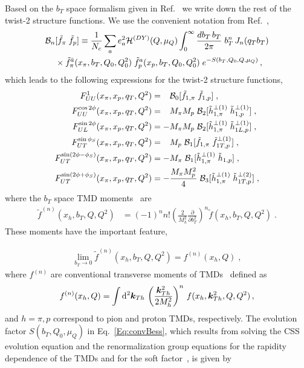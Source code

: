 \documentclass[a4paper]{article}
\newcommand{\nn}{\nonumber\\}
\newcommand{\be}{\begin{equation}}
\newcommand{\ee}{\end{equation}}
\newcommand{\di}{ {\rm d} }
\def\kTh{\bm k_{Th}}
\begin{document}
  Based on the $b_T$ space formalism given in Ref.~\cite{Boer:2011xd} we  write down the rest of the twist-2 structure functions. We use the convenient notation from Ref.~\cite{Bacchetta:2019qkv}, 
\begin{align}
     {\cal B}_n[\tilde f_{\pi}\; \tilde f_{p}] & \equiv  \frac{1}{N_c} 
     \sum_a e_a^2 {\cal H}^{(DY)}(Q,\mu_Q) \int_0^\infty \frac{d b_T\, b_T}{2\pi}\; b_T^n \, J_n(q_T b_T)
     \nn &\hskip -1cm \times  \tilde f_{\pi}^{\bar a}(x_\pi,{b_{T}},Q_0,Q_0^2) 
     \; \tilde f_{p}^{ a}(x_p,{b_{T}},Q_0,Q_0^2) \; e^{-S(b_{T},Q_0,Q,\mu_Q)}\, ,
    \label{Eq:convBess}
\end{align}
 which leads to the  following expressions for  the   twist-2 structure functions,
\begin{align}
{F}_{UU}^1(x_\pi,x_p,q_T,Q^2) &=
   \phantom{-}   {\cal B}_0[\tilde f_{1, \pi}\; \tilde f_{1,p}] \; ,
    \label{e:upb} \\
{F}_{UU}^{\cos 2\phi}(x_\pi,x_p,q_T,Q^2) &= 
  \phantom{-}   M_\pi M_p \; {\cal B}_2[\tilde h_{1,\pi}^{\perp(1)}\; \tilde h_{1,p}^{\perp(1)}]\; ,
\label{e:bmb}   \\
{F}_{UL}^{\sin 2\phi}(x_\pi,x_p,q_T,Q^2)&=
   - M_\pi  M_p \; {\cal B}_2[\tilde h_{1,\pi}^{\perp(1)}\; \tilde  h_{1L,p}^{\perp(1)}]\; ,
   \label{e:kotzb} \\
{F}_{UT}^{\sin \phi_S}(x_\pi,x_p,q_T,Q^2) &= 
  \phantom{-} M_p \;{\cal B}_1[\tilde f_{1,\pi}\; \tilde  f_{1T,p}^{\perp(1)}]\; ,
  \label{e:Sivb}\\
{F}_{UT}^{\sin (2\phi -\phi_S)}(x_\pi,x_p,q_T,Q^2) &=
    -M_\pi \;{\cal B}_1[\tilde h_{1,\pi}^{\perp(1)}\; \tilde  h_{1,p}]
    \label{e:bmtb}\; ,\\
{F}_{UT}^{\sin (2\phi + \phi_S)}(x_\pi,x_p,q_T,Q^2) &=
    -\frac{M_\pi M_p^2}{4} \; {\cal B}_3[\tilde h_{1,\pi}^{\perp(1)}\; \tilde  h_{1T,p}^{\perp(2)}]
\; ,\label{Eq:sfsb}
\end{align}
where the $b_T$ space TMD moments~\cite{Boer:2011xd} are
\begin{align}
    \tilde f^{(n)}(x_h,b_T,Q,Q^2) &=(-1)^n  n! \left(\frac{2}{M_h^2}\frac{\partial}{\partial b_T^2}\right)^n 
    \tilde f(x_h,b_T,Q,Q^2) \; .
\end{align}
 These moments have the important feature,
 
\begin{align}
    \lim_{b_T \to 0} \tilde f^{(n)}(x_h,b_T,Q,Q^2) = f^{(n)}(x_h,Q)\; ,
\end{align}
where $f^{(n)}$ are   conventional transverse moments of TMDs~\cite{Mulders:1995dh}  defined as
\be
       f^{(n)}(x_h,Q)=\int\di^2\kTh\,\left(\frac{\kTh^2}{2M_h^2}\right)^n\,f(x_h,\kTh^2,Q,Q^2)\, ,
       \label{e:TMDmoment}
\ee
and $h=\pi, p$ correspond to pion and proton TMDs, respectively.
The evolution factor $S(b_T, Q_0, \mu_Q)$   in Eq.~\eqref{Eq:convBess},  
which results from  
solving the CSS evolution equation and the renormalization group
equations for the rapidity dependence of the TMDs
and for the soft factor~\cite{Aybat:2011zv,Collins:2011zzd}, is given by
\end{document}

